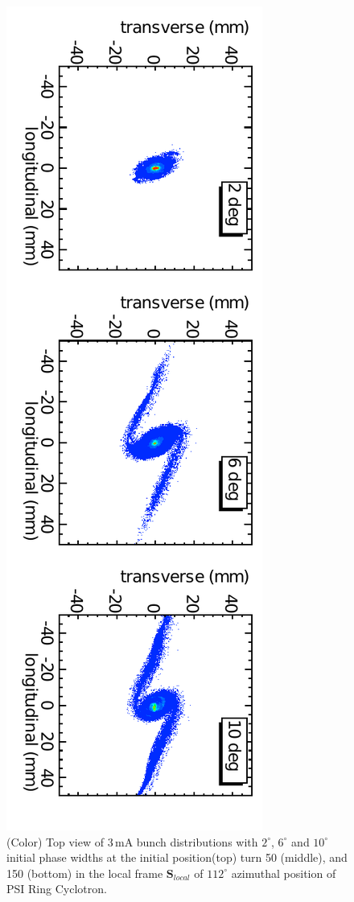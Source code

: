 \documentclass[aps,prstab,onecolumn,superscriptaddress,showpacs]{revtex4}
\newcommand{\bs}[1]{\mathbf #1}
\begin{document}
\begin{figure}
  \includegraphics[angle=90,width=0.9\linewidth]{figures/Turn-150.pdf}
  \caption{(Color) Top view of 3\,mA bunch distributions with  $2^\circ$, $6^\circ$ and $10^\circ$ initial phase widths at the initial position(top) turn 50 (middle), and 150 (bottom) 
    in the local frame ${\bs{S}_{local}}$ of $112^\circ$ azimuthal position of PSI Ring Cyclotron. }
  \label{fig:RingPhaseWidth}
\end{figure}
\end{document}
